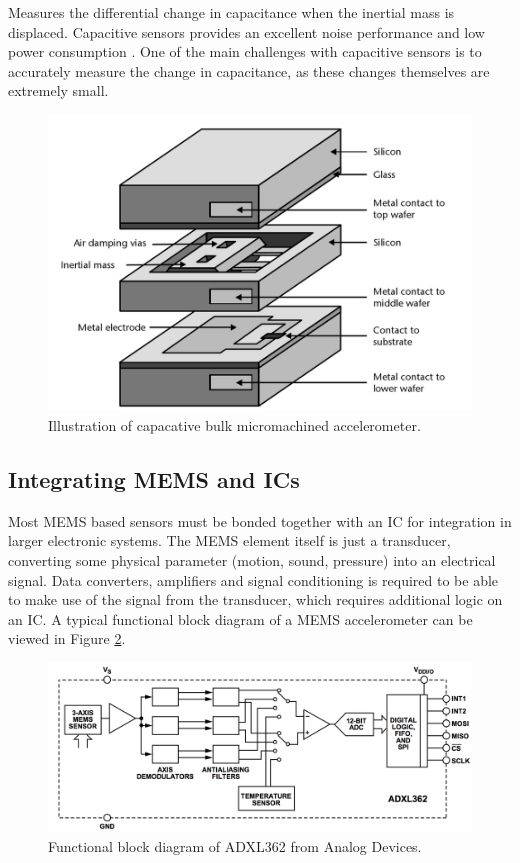 Measures the differential change in capacitance when the inertial mass is displaced. Capacitive sensors provides an excellent noise performance and low power consumption \cite[p.~91]{kaajakari09}. One of the main challenges with capacitive sensors is to accurately measure the change in capacitance, as these changes themselves are extremely small. 

\begin{figure}[h]
\centering
\includegraphics[scale=0.25]{fig/bulk_micromachined.png}
\caption{Illustration of capacative bulk micromachined accelerometer. \cite[p.~100]{maluf04}}
\label{fig:bulk_micromachined}
\end{figure}

\subsection{Integrating MEMS and ICs}

Most MEMS based sensors must be bonded together with an IC for integration in larger electronic systems. The MEMS element itself is just a transducer, converting some physical parameter (motion, sound, pressure) into an electrical signal. Data converters, amplifiers and signal conditioning is required to be able to make use of the signal from the transducer, which requires additional logic on an IC. A typical functional block diagram of a MEMS accelerometer can be viewed in Figure \ref{fig:ADXL362_functional}. 

\begin{figure}[h]
\centering
\includegraphics[scale=0.5]{fig/ADXL362_functional_block.png}
\caption{Functional block diagram of ADXL362 from Analog Devices.}
\label{fig:ADXL362_functional}
\end{figure}

